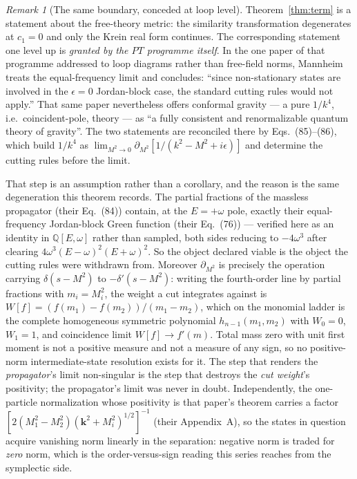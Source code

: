 \documentclass[11pt]{article}
\theoremstyle{definition}
\theoremstyle{remark}
\newtheorem{remark}[theorem]{Remark}
\begin{document}
\begin{remark}[The same boundary, conceded at loop level]
\label{rem:mannheimloop}
Theorem~\ref{thm:term} is a statement about the free-theory metric:
the similarity transformation degenerates at $c_1=0$ and only the Krein
real form continues.  The corresponding statement one level up is
\emph{granted by the $PT$ programme itself}.  In the one paper of that
programme addressed to loop diagrams rather than free-field norms,
Mannheim~\cite{Mannheim2018loops} treats the equal-frequency limit and
concludes: ``since non-stationary states are involved in the
$\epsilon=0$ Jordan-block case, the standard cutting rules would not
apply.''  That same paper nevertheless offers conformal gravity --- a
pure $1/k^4$, i.e.\ coincident-pole, theory --- as ``a fully consistent
and renormalizable quantum theory of gravity''.  The two statements are
reconciled there by Eqs.~(85)--(86), which build $1/k^4$ as
$\lim_{M^2\to0}\partial_{M^2}[1/(k^2-M^2+i\epsilon)]$ and determine the
cutting rules before the limit.

That step is an assumption rather than a corollary, and the reason is
the same degeneration this theorem records.  The partial fractions of
the massless propagator (their Eq.~(84)) contain, at the $E=+\omega$
pole, exactly their equal-frequency Jordan-block Green function
(their Eq.~(76)) --- verified here as an identity in $\mathbb{Q}[E,\omega]$
rather than sampled, both sides reducing to $-4\omega^3$ after clearing
$4\omega^3(E-\omega)^2(E+\omega)^2$.  So the object declared viable is
the object the cutting rules were withdrawn from.  Moreover
$\partial_{M^2}$ is precisely the operation carrying $\delta(s-M^2)$ to
$-\delta'(s-M^2)$: writing the fourth-order line by partial fractions
with $m_i=M_i^2$, the weight a cut integrates against is
$W[f]=(f(m_1)-f(m_2))/(m_1-m_2)$, which on the monomial ladder is the
complete homogeneous symmetric polynomial $h_{n-1}(m_1,m_2)$ with
$W_0=0$, $W_1=1$, and coincidence limit $W[f]\to f'(m)$.  Total mass
zero with unit first moment is not a positive measure and not a measure
of any sign, so no positive-norm intermediate-state resolution exists
for it.  The step that renders the \emph{propagator}'s limit
non-singular is the step that destroys the \emph{cut weight}'s
positivity; the propagator's limit was never in doubt.  Independently,
the one-particle normalization whose positivity is that paper's theorem
carries a factor $[2(M_1^2-M_2^2)(\mathbf k^2+M_i^2)^{1/2}]^{-1}$
(their Appendix~A), so the states in question acquire vanishing norm
linearly in the separation: negative norm is traded for \emph{zero}
norm, which is the order-versus-sign reading this series reaches from
the symplectic side.


\end{remark}
\end{document}
